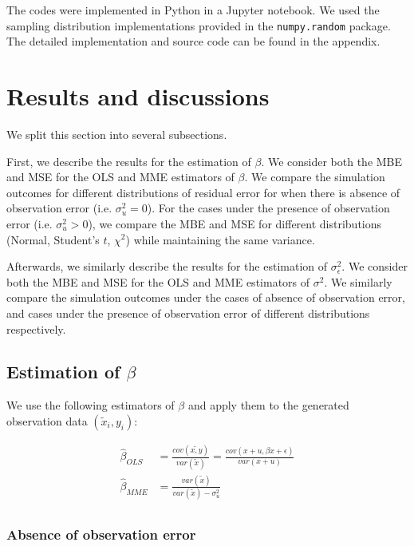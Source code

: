 \documentclass{article}
\begin{document}
The codes were implemented in Python in a Jupyter notebook. We used the sampling distribution implementations provided in the \verb|numpy.random| package. The detailed implementation and source code can be found in the appendix.

\section{Results and discussions}

We split this section into several subsections.

First, we describe the results for the estimation of $\beta$.
We consider both the MBE and MSE for the OLS and MME estimators of $\beta$. 
We compare the simulation outcomes for different distributions of residual error for when there is absence of observation error (i.e. $\sigma^2_u = 0$).
For the cases under the presence of observation error (i.e. $\sigma^2_u > 0$), we compare the MBE and MSE for different distributions (Normal, Student's $t$, $\chi^2$) while maintaining the same variance.

Afterwards, we similarly describe the results for the estimation of $\sigma^2_\epsilon$.
We consider both the MBE and MSE for the OLS and MME estimators of $\sigma^2$.
We similarly compare the simulation outcomes under the cases of absence of observation error, and cases under the presence of observation error of different distributions respectively.

\subsection{Estimation of $\beta$}

We use the following estimators of $\beta$ and apply them to the generated observation data $(\tilde{x}_i, y_i)$:

\begin{equation}
    \begin{split}
        \hat{\beta}_{OLS} &= \frac{cov(\tilde{x, y})}{var(\tilde{x})} = \frac{cov(x+u, \beta x + \epsilon)}{var(x + u)}\\
        \hat{\beta}_{MME} &= \frac{var(\tilde{x})}{var(\tilde{x}) - \sigma^2_u}\\
    \end{split}
\end{equation}

\subsubsection{Absence of observation error}
\end{document}
